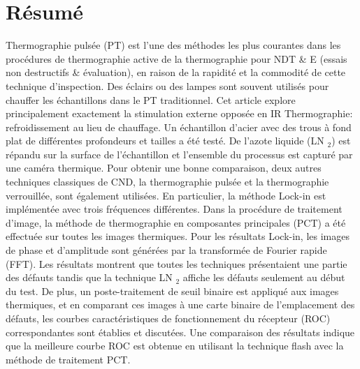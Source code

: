 \section*{Résumé}
Thermographie pulsée (PT) est l'une des méthodes les plus courantes dans les procédures de thermographie active de la thermographie pour NDT \& E ​​(essais non destructifs  \& évaluation), en raison de la rapidité et la commodité de cette technique d'inspection. Des éclairs ou des lampes sont souvent utilisés pour chauffer les échantillons dans le PT traditionnel. Cet article explore principalement exactement la stimulation externe opposée en IR Thermographie: refroidissement au lieu de chauffage. Un échantillon d'acier avec des trous à fond plat de différentes profondeurs et tailles a été testé. De l'azote liquide (LN $_2$) est répandu sur la surface de l'échantillon et l'ensemble du processus est capturé par une caméra thermique. Pour obtenir une bonne comparaison, deux autres techniques classiques de CND, la thermographie pulsée et la thermographie verrouillée, sont également utilisées. En particulier, la méthode Lock-in est implémentée avec trois fréquences différentes. Dans la procédure de traitement d'image, la méthode de thermographie en composantes principales (PCT) a été effectuée sur toutes les images thermiques. Pour les résultats Lock-in, les images de phase et d'amplitude sont générées par la transformée de Fourier rapide (FFT). Les résultats montrent que toutes les techniques présentaient une partie des défauts tandis que la technique LN $_2$ affiche les défauts seulement au début du test. De plus, un poste-traitement de seuil binaire est appliqué aux images thermiques, et en comparant ces images à une carte binaire de l'emplacement des défauts, les courbes caractéristiques de fonctionnement du récepteur (ROC) correspondantes sont établies et discutées. Une comparaison des résultats indique que la meilleure courbe ROC est obtenue en utilisant la technique flash avec la méthode de traitement PCT.


